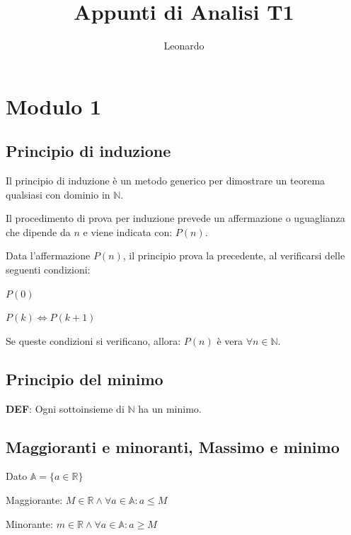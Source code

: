 \documentclass{article}
\title{Appunti di Analisi T1}
\author{Leonardo}
\begin{document}
\maketitle

\section{Modulo 1}

\subsection{Principio di induzione}

Il principio di induzione è un metodo generico per dimostrare
un teorema qualsiasi con dominio in $\mathbb{N}$.

\vspace{5mm}
\noindent
Il procedimento di prova per induzione prevede un affermazione
o uguaglianza che dipende da $n$ e viene indicata con: $P(n)$.

\vspace{5mm}
\noindent
Data l'affermazione $P(n)$, il principio prova
la precedente, al verificarsi delle seguenti condizioni:


\begin{induzione}
    \item $P(0)$
    \item $P(k) \Leftrightarrow P(k+1)$
\end{induzione}

\noindent
Se queste condizioni si verificano, allora: $P(n)$ è vera $\forall n \in \mathbb{N}$.

\subsection{Principio del minimo}

\textbf{DEF}: Ogni sottoinsieme di $\mathbb{N}$ ha un minimo.

\subsection{Maggioranti e minoranti, Massimo e minimo}

Dato $\mathbb{A} = \{ a \in \mathbb{R} \}$


\begin{maggioranti}
    \item Maggiorante: $M \in \mathbb{R} \land \forall a \in \mathbb{A} : a \leq M$
    \item Minorante: $m \in \mathbb{R} \land \forall a \in \mathbb{A} : a \geq M$
\end{maggioranti}
\end{document}
